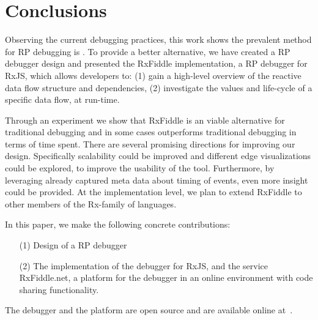 \section{Conclusions} Observing the current debugging practices, this
work shows the prevalent method for RP debugging is \printfdebugging{}.
To provide a better alternative, we have created a RP debugger design
and presented the RxFiddle implementation, a RP debugger for RxJS, which
allows developers to:  (1) gain a high-level overview of the reactive
data flow structure and dependencies, (2) investigate the values and
life-cycle of a specific data flow, at run-time.

Through an experiment we show that RxFiddle is an viable alternative for
traditional debugging and in some cases outperforms traditional
debugging in terms of time spent.  There are several promising
directions for improving our design.  Specifically scalability could be
improved and different edge visualizations could be explored, to improve
the usability of the tool.  Furthermore, by leveraging already captured
meta data about timing of events, even more insight could be provided.
At the implementation level, we plan to extend RxFiddle to other members
of the Rx-family of languages.

In this paper, we make the following concrete contributions:
\begin{itemize}
    \item[(1)]
        Design of a RP debugger
    \item[(2)]
        The implementation of the debugger for RxJS, and the service
        RxFiddle.net, a platform for the debugger in an online
        environment with code sharing functionality.
\end{itemize}

The debugger and the platform are open source and are available online
at~\cite{rxfiddle-doi}.
